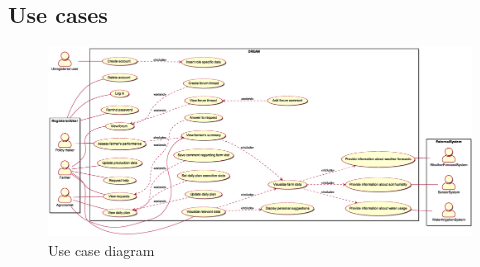 \subsection{Use cases}
\begin{figure}[H]
    \centering
    \includegraphics[width=0.96\textheight, keepaspectratio, origin=c, angle=90]{diagrams/use_case}
    \caption{Use case diagram}
    \label{fig:uc_diagram}
\end{figure}

